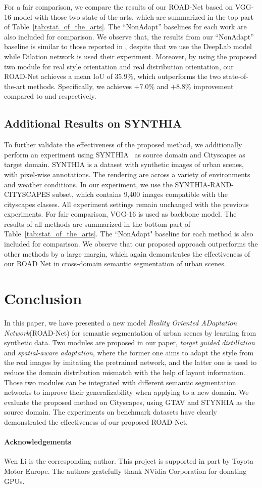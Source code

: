 \documentclass[10pt,twocolumn,letterpaper]{article}
\begin{document}
For a fair comparison, we compare the results of our ROAD-Net based on VGG-16 model with those two state-of-the-arts, which are summarized in the top part of Table~\ref{tab:stat_of_the_arts}. The ``NonAdapt'' baselines for each work are also included for comparison. We observe that, the results from our ``NonAdapt'' baseline is similar to those reported in \cite{hoffman2016fcns,zhang2017curriculum}, despite that we use the DeepLab model while Dilation network is used their experiment. Moreover, by using the proposed two module for real style orientation and real distribution orientation, our ROAD-Net achieves a mean IoU of $35.9\%$, which outperforms the two state-of-the-art methods. Specifically, we achieves $+7.0\%$ and $+8.8\%$ improvement compared to \cite{zhang2017curriculum} and \cite{hoffman2016fcns} respectively.


\subsection{Additional Results on SYNTHIA}
To further validate the effectiveness of the proposed method, we additionally perform an experiment using SYNTHIA~\cite{ros2016synthia} as source domain and Cityscapes as target domain. SYNTHIA is a dataset with synthetic images of urban scenes, with pixel-wise annotations. The rendering are across a variety of environments and weather conditions. In our experiment, we use the SYNTHIA-RAND-CITYSCAPES subset, which contains 9,400 images compatible with the cityscapes classes. All experiment settings remain unchanged with the previous experiments. For fair comparison, VGG-16 is used as backbone model. The results of all methods are summarized in the bottom part of Table~\ref{tab:stat_of_the_arts}. The ``NonAdapt" baseline for each method is also included for comparison. We observe that our proposed approach outperforms the other methods by a large margin, which again demonstrates the effectiveness of our ROAD Net in cross-domain semantic segmentation of urban scenes.  



\section{Conclusion}
In this paper, we have presented a new model \textit{Reality Oriented ADaptation Network}(ROAD-Net) for semantic segmentation of urban scenes by learning from synthetic data. Two modules are proposed in our paper, \textit{target guided distillation} and \textit{spatial-aware adaptation}, where the former one aims to adapt the style from the real images by imitating the pretrained network, and the latter one is used to reduce the domain distribution mismatch with the help of layout information. Those two modules can be integrated with different semantic segmentation networks to improve their generalizability when applying to a new domain. We evaluate the proposed method on Cityscapes, using GTAV and STYNHIA as the source domain. The experiments on benchmark datasets have clearly demonstrated the effectiveness of our proposed ROAD-Net.

\paragraph{Acknowledgements}
Wen Li is the corresponding author. This project is supported in part by Toyota Motor Europe. The authors gratefully thank NVidia Corporation for donating GPUs.

{\small


}
\end{document}
